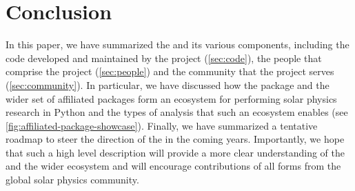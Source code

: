 \section{Conclusion}
\label{sec:conclusion}

In this paper, we have summarized the \sunpyproj and its various components, including the code developed and maintained by the project (\autoref{sec:code}), the people that comprise the project (\autoref{sec:people}) and the community that the project serves (\autoref{sec:community}).
In particular, we have discussed how the \sunpypkg package and the wider set of affiliated packages form an ecosystem for performing solar physics research in Python and the types of analysis that such an ecosystem enables (see \autoref{fig:affiliated-package-showcase}).
Finally, we have summarized a tentative roadmap to steer the direction of the \sunpyproj in the coming years.
Importantly, we hope that such a high level description will provide a more clear understanding of the \sunpyproj and the wider ecosystem and will encourage contributions of all forms from the global solar physics community.

